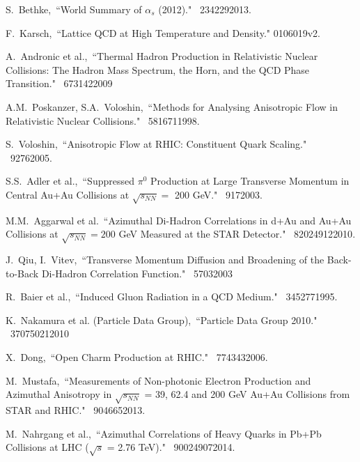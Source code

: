 \begin{thebibliography}{1000}


S.~Bethke,~``World Summary of $\alpha_{s}$ (2012)." \Journal{\NPB} {~234}{229}{2013}.

F.~Karsch,~``Lattice QCD at High Temperature and Density." \arXiv0106019v2.

A.~Andronic et al.,~``Thermal Hadron Production in Relativistic Nuclear Collisions: The Hadron Mass Spectrum, the Horn, and the QCD Phase Transition." \Journal{\PLB} {~673}{142}{2009}

A.M.~Poskanzer, S.A.~Voloshin,~``Methods for Analysing Anisotropic Flow in Relativistic Nuclear Collisions." \Journal{\PRC} {~58}{1671}{1998}.

S.~Voloshin,~``Anisotropic Flow at RHIC: Constituent Quark Scaling." \textit {}~{} {~9}{276}{2005}.

S.S.~Adler et al.,~``Suppressed $\pi^0$ Production at Large Transverse Momentum in Central Au+Au Collisions at $\sqrt{s_{NN}} = $ 200 GeV." \Journal{\PRL} {~91}{7}{2003}.

M.M.~Aggarwal et al.~``Azimuthal Di-Hadron Correlations in d+Au and Au+Au Collisions at $\sqrt{s_{NN}} = 200$ GeV Measured at the STAR Detector." \Journal{\PRC} {~82}{024912}{2010}.

J.~Qiu, I.~Vitev,~``Transverse Momentum Diffusion and Broadening of the Back-to-Back Di-Hadron Correlation Function." \Journal{\PLB} {~570}{3}{2003}

R.~Baier et al.,~``Induced Gluon Radiation in a QCD Medium." \Journal{\PLB} {~345}{277}{1995}.

K.~Nakamura et al. (Particle Data Group),~``Particle Data Group 2010." \Journal{\JPG} {~37}{075021}{2010}

X.~Dong,~``Open Charm Production at RHIC." \Journal{\NPA} {~774}{343}{2006}.

M.~Mustafa,~``Measurements of Non-photonic Electron Production and Azimuthal Anisotropy in $\sqrt{s_{NN}}$ = 39, 62.4 and 200 GeV Au+Au Collisions from STAR and RHIC." \Journal{\NPA} {~904}{665}{2013}.

M.~Nahrgang et al.,~``Azimuthal Correlations of Heavy Quarks in Pb+Pb Collisions at LHC ($\sqrt{s}$ = 2.76 TeV)." \Journal{\PRC} {~90}{024907}{2014}.


\end{thebibliography}
